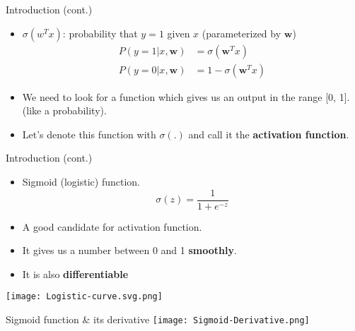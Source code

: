 \documentclass[serif, aspectratio=169]{beamer}
\begin{document}
\begin{frame}{Introduction (cont.)}
    \begin{itemize}
        \item $\sigma (w^Tx)$: probability that $y=1$ given $x$ (parameterized by \textbf{$\textbf{w}$})
      \begin{align*}
        P(y=1|x,\mathbf{w}) &= \sigma (\mathbf{w}^Tx) \\
        P(y=0|x,\mathbf{w}) &= 1 - \sigma (\mathbf{w}^Tx)
      \end{align*}

        \item We need to look for a function which gives us an output in the range [0, 1]. (like a probability).

        \item Let's denote this function with $\sigma (.)$ and call it the \textbf{activation function}.
        
    \end{itemize}
\end{frame}

\begin{frame}{Introduction (cont.)}
    \begin{minipage}{0.55\textwidth}
    \begin{itemize}
        \item Sigmoid (logistic) function.
        \[
            \sigma (z) = \frac{1}{1 + e^{-z}}
        \]
        \item A good candidate for activation function.
        
        \item It gives us a number between 0 and 1 \textbf{smoothly}.
        \item It is also \textbf{differentiable}

    \end{itemize}
    \end{minipage}%
    \begin{minipage}{0.4\textwidth}
        \centering
        \texttt{[image: Logistic-curve.svg.png]}
    \end{minipage}
\end{frame}

\begin{frame}{Sigmoid function \& its derivative}
    \centering
        \texttt{[image: Sigmoid-Derivative.png]}
\end{frame}
\end{document}
